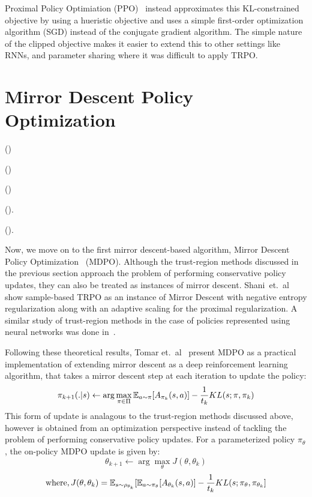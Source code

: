 Proximal Policy Optimiation (PPO)~\cite{schulmanProximal2017} instead approximates this
KL-constrained objective by using a hueristic objective and uses a simple first-order optimization
algorithm (SGD) instead of the conjugate gradient algorithm.
The simple nature of the clipped objective makes it easier to extend this to other settings like
RNNs, and parameter sharing where it was difficult to apply TRPO.

\section[MDPO]{Mirror Descent Policy Optimization}
 ()

 ()

 ()

 ().

().

Now, we move on to the first mirror descent-based algorithm, Mirror Descent Policy
Optimization~\cite{tomarMirror2022} (MDPO).
Although the trust-region methods discussed in the previous section approach the problem of
performing conservative policy updates, they can also be treated as instances of mirror descent.
Shani~et.~al~\cite{shaniAdaptive2020} show sample-based TRPO as an instance of Mirror Descent with
negative entropy regularization along with an adaptive scaling for the proximal regularization.
A similar study of trust-region methods in the case of policies represented using neural networks
was done in~\cite{liuNeural2019}.

Following these theoretical results, Tomar et.~al~\cite{tomarMirror2022} present MDPO as a
practical implementation of extending mirror descent as a deep reinforcement learning algorithm,
that takes a mirror descent step at each iteration to update the policy:
\begin{equation}
	\label{eqn:mdrl} \pi_{k+1}(.
	|s) \leftarrow \arg
	\max_{\pi \in \Pi}
	\mathbb{E}_{a \sim \pi} [A_{\pi_k}(s,a)] -
	\frac{1}{t_k}
	KL(s; \pi, \pi_k)
\end{equation} This form of update is analagous to the trust-region methods
discussed above, however is obtained from an optimization perspective instead of tackling the
problem of performing conservative policy updates.
For a parameterized policy $\pi_{\theta}$, the on-policy MDPO update is given by: $$ \theta_{k+1}
	\leftarrow \arg \max_{\theta} J(\theta, \theta_k)$$ $$ \text{where}, J(\theta, \theta_k) = \mathbb{E}_{s
		\sim \rho_{\theta_k}} [ \mathbb{E}_{a \sim \pi_\theta}[A_{\theta_k}(s,a)] - \frac{1}{t_k} KL(s; \pi_\theta,
		\pi_{\theta_k}]$$

